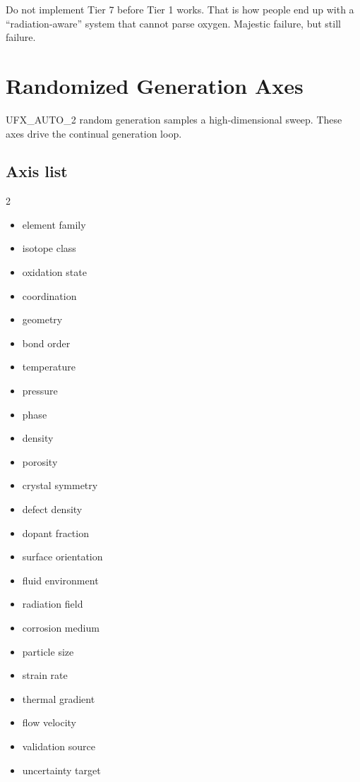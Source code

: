 \documentclass[11pt, a4paper]{article}
\begin{document}
\begin{rulebox}
Do not implement Tier 7 before Tier 1 works. That is how people end up with a ``radiation-aware'' system that cannot parse oxygen. Majestic failure, but still failure.
\end{rulebox}

\section{Randomized Generation Axes}

UFX\_AUTO\_2 random generation samples a high-dimensional sweep. These axes drive the continual generation loop.

\subsection{Axis list}

\begin{multicols}{2}
\begin{itemize}[itemsep=1pt, leftmargin=*]
  \item element family
  \item isotope class
  \item oxidation state
  \item coordination
  \item geometry
  \item bond order
  \item temperature
  \item pressure
  \item phase
  \item density
  \item porosity
  \item crystal symmetry
  \item defect density
  \item dopant fraction
  \item surface orientation
  \item fluid environment
  \item radiation field
  \item corrosion medium
  \item particle size
  \item strain rate
  \item thermal gradient
  \item flow velocity
  \item validation source
  \item uncertainty target
\end{itemize}
\end{multicols}
\end{document}
